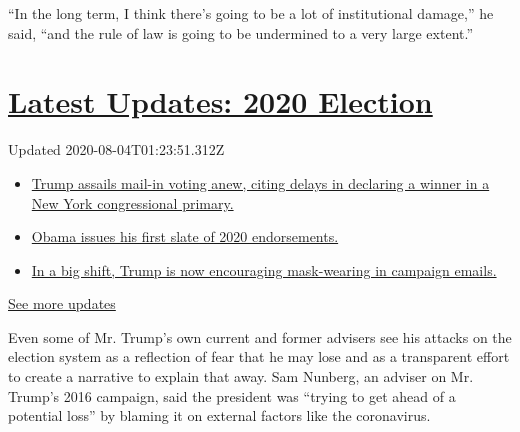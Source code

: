 ``In the long term, I think there's going to be a lot of institutional
damage,'' he said, ``and the rule of law is going to be undermined to a
very large extent.''

\hypertarget{latest-updates-2020-election}{%
\section{\texorpdfstring{\href{https://www.nytimes.com/2020/08/03/us/elections/biden-vs-trump.html?action=click\&pgtype=Article\&state=default\&region=MAIN_CONTENT_1\&context=storylines_live_updates}{Latest
Updates: 2020
Election}}{Latest Updates: 2020 Election}}\label{latest-updates-2020-election}}

Updated 2020-08-04T01:23:51.312Z

\begin{itemize}
\tightlist
\item
  \href{https://www.nytimes.com/2020/08/03/us/elections/biden-vs-trump.html?action=click\&pgtype=Article\&state=default\&region=MAIN_CONTENT_1\&context=storylines_live_updates\#link-6494b448}{Trump
  assails mail-in voting anew, citing delays in declaring a winner in a
  New York congressional primary.}
\item
  \href{https://www.nytimes.com/2020/08/03/us/elections/biden-vs-trump.html?action=click\&pgtype=Article\&state=default\&region=MAIN_CONTENT_1\&context=storylines_live_updates\#link-3de249e6}{Obama
  issues his first slate of 2020 endorsements.}
\item
  \href{https://www.nytimes.com/2020/08/03/us/elections/biden-vs-trump.html?action=click\&pgtype=Article\&state=default\&region=MAIN_CONTENT_1\&context=storylines_live_updates\#link-54e34d20}{In
  a big shift, Trump is now encouraging mask-wearing in campaign
  emails.}
\end{itemize}

\href{https://www.nytimes.com/2020/08/03/us/elections/biden-vs-trump.html?action=click\&pgtype=Article\&state=default\&region=MAIN_CONTENT_1\&context=storylines_live_updates}{See
more updates}

Even some of Mr. Trump's own current and former advisers see his attacks
on the election system as a reflection of fear that he may lose and as a
transparent effort to create a narrative to explain that away. Sam
Nunberg, an adviser on Mr. Trump's 2016 campaign, said the president was
``trying to get ahead of a potential loss'' by blaming it on external
factors like the coronavirus.

